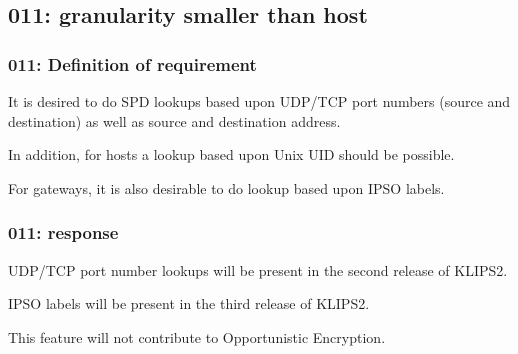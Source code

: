 \subsection{011: granularity smaller than host}

\label{req011}

\subsubsection{011: Definition of requirement }

It is desired to do SPD lookups based upon UDP/TCP port numbers (source and
destination) as well as source and destination address.

In addition, for hosts a lookup based upon Unix UID should be possible.

For gateways, it is also desirable to do lookup based upon IPSO labels.

\subsubsection{011: response}

UDP/TCP port number lookups will be present in the second release of KLIPS2.

IPSO labels will be present in the third release of KLIPS2.

This feature will not contribute to Opportunistic Encryption.



